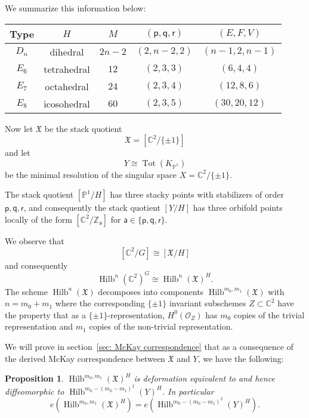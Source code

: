 \documentclass{amsart}
\newtheorem{proposition}[theorem]{Proposition}
\theoremstyle{definition}
\newcommand{\CC} {{\mathbb C}}          %
\newcommand{\ZZ} {{\mathbb Z}}		%
\newcommand{\PP}{\mathbb{P}}
\newcommand{\X}{\mathfrak{X}}
\renewcommand{\O}{\mathcal{O}}
\newcommand{\varp}{\mathsf{p}}
\newcommand{\varq}{\mathsf{q}}
\newcommand{\varr}{\mathsf{r}}
\newcommand{\vara}{\mathsf{a}}
\newcommand{\Hilb}{\operatorname{Hilb}}
\begin{document}
We summarize this information below:

\begin{center}
\begin{tabular}{|c|c|c|c|c|}
\hline
Type &	$H$ &	$M$&	$(\varp ,\varq ,\varr )$ &	$(E,F,V)$\\ \hline \hline 
$D_{n}$     & dihedral & $2n-2$ & $(2,n-2,2)$& $(n-1,2,n-1)$	\\ \hline
$E_{6}$     & tetrahedral & $12$ & $(2,3,3)$& $(6,4,4)$	\\ \hline
$E_{7}$     & octahedral & $24$ & $(2,3,4)$& $(12,8,6)$	\\ \hline
$E_{8}$     & icosohedral & $60$ & $(2,3,5)$& $(30,20,12)$	\\ \hline
\end{tabular}
\end{center}

\bigskip

Now let $\X$ be the stack quotient
\[
\X=[\CC^{2}/ \{\pm 1 \}]
\]
and let
\[
Y\cong \operatorname{Tot}(K_{\PP^{1}})
\]
be the minimal resolution of the singular space $X=\CC^{2}/\{\pm 1
\}$.

The stack quotient $[\PP^{1}/H]$ has three stacky points with
stabilizers of order $\varp ,\varq ,\varr$, and consequently the stack
quotient $[Y/H]$ has three orbifold points locally of the form
$[\CC^{2}/\ZZ_{\vara }]$ for $\vara \in \{\varp ,\varq ,\varr \}$.


We observe that 
\[
 [\CC^{2}/G ] \cong [\X /H ]
\]
and consequently
\[
\Hilb^{n}(\CC^{2})^{G}  \cong \Hilb^{n}(\X )^{H} .
\]
The scheme $ \Hilb^{n}(\X )$ decomposes into components
$\Hilb^{m_{0},m_{1}}(\X )$ with $n=m_{0}+m_{1}$ where the
corresponding $\{\pm 1 \}$ invariant subschemes $Z\subset \CC^{2}$
have the property that as a $\{\pm 1 \}$-representation,
$H^{0}(\O_{Z})$ has $m_{0}$ copies of the trivial representation and
$m_{1}$ copies of the non-trivial representation.

We will prove in section~\ref{sec: McKay correspondence} that as a
consequence of the derived McKay correspondence between $\X$ and $Y$,
we have the following:
\begin{proposition}\label{prop: Hilb(X,m0,m1) = Hilb(Y,m0-(m0-m1)^2)}
$\Hilb^{m_{0},m_{1}}(\X )^{H}$ is deformation equivalent to and hence
diffeomorphic to $\Hilb^{m_{0}-(m_{0}-m_{1})^{2}}(Y)^{H}$. In
particular
\[
e\left(\Hilb^{m_{0},m_{1}}(\X )^{H} \right)
=e\left(\Hilb^{m_{0}-(m_{0}-m_{1})^{2}}(Y)^{H} \right). 
\]
\end{proposition}
\end{document}

